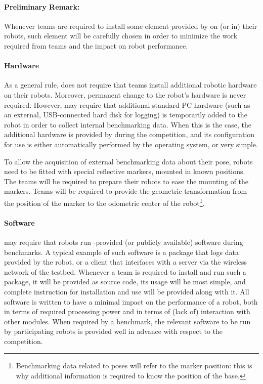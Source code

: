\paragraph{Preliminary Remark:}
Whenever teams are required to install some element provided by \erlir on (or in) their robots, such element will be carefully chosen in order to minimize the work required from teams and the impact on robot performance.

\paragraph{Hardware}
As a general rule, \erlir does not require that teams install additional robotic hardware on their robots. Moreover, permanent change to the robot's hardware is never required. However, \erlir may require that additional standard PC hardware (such as an external, USB-connected hard disk for logging) is temporarily added to the robot in order to collect internal benchmarking data. When this is the case, the additional hardware is provided by \erlir during the competition, and its configuration for use is either automatically performed by the operating system, or very simple.

To allow the acquisition of external benchmarking data about their pose, robots need to be fitted with special reflective markers, mounted in known positions. The teams will be required to prepare their robots to ease the mounting of the markers. Teams will be required to provide the geometric transformation from the position of the marker to the odometric center of the robot\footnote{Benchmarking data related to poses will refer to the marker position: this is why additional information is required to know the position of the base.}.

\paragraph{Software} \erlir may require that robots run \erlir-provided (or publicly available) software during benchmarks. A typical example of such software is a package that logs data provided by the robot, or a client that interfaces with a \erlir server via the wireless network of the testbed. Whenever a team is required to install and run such a package, it will be provided as source code, its usage will be most simple, and complete instruction for installation and use will be provided along with it. All \erlir software is written to have a minimal impact on the performance of a robot, both in terms of required processing power and in terms of (lack of) interaction with other modules. When required by a benchmark, the relevant \erlir software to be run by participating robots is provided well in advance with respect to the competition.

